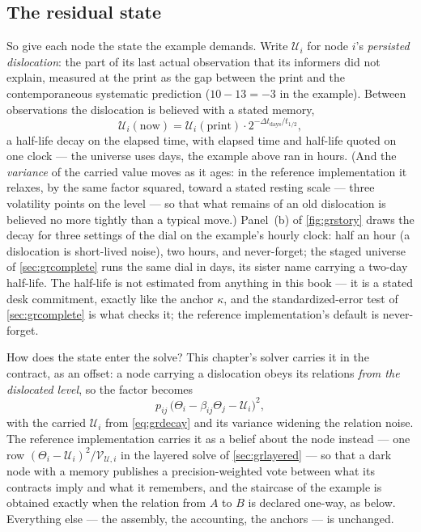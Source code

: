 \subsection{The residual state}

So give each node the state the example demands.  Write $\mathcal{U}_i$
for node $i$'s \emph{persisted dislocation}: the part of its last
actual observation that its informers did not explain, measured at the
print as the gap between the print and the contemporaneous
systematic prediction ($10-13=-3$ in the example).  Between
observations the dislocation is believed with a stated memory,
\begin{equation}
\mathcal{U}_i(\text{now})
=\mathcal{U}_i(\text{print})\cdot
2^{-\Delta t_{\mathrm{days}}/t_{1/2}},
\label{eq:grdecay}
\end{equation}
a half-life decay on the elapsed time, with elapsed time and
half-life quoted on one clock --- the universe uses
days, the example above ran in hours.  (And the \emph{variance} of the
carried value moves as it ages: in the reference implementation it
relaxes, by the same factor squared, toward a stated resting scale
--- three volatility points on the level --- so that what remains of
an old dislocation is believed no more tightly than a typical
move.)  Panel~(b) of \cref{fig:grstory} draws
the decay for three settings of the dial on the example's hourly clock:
half an hour (a dislocation is short-lived noise), two hours, and
never-forget; the staged universe of \cref{sec:grcomplete} runs the
same dial in days, its sister name carrying a two-day half-life.  The
half-life is not estimated from anything in this book --- it is a
stated desk commitment, exactly like the anchor $\kappa$, and the
standardized-error test of \cref{sec:grcomplete} is what checks it;
the reference implementation's default is never-forget.

How does the state enter the solve?  This chapter's solver carries
it in the contract, as an offset: a node carrying a dislocation obeys
its relations \emph{from the dislocated level}, so the factor becomes
\[
p_{ij}\,\bigl(\Theta_i-\beta_{ij}\Theta_j-\mathcal{U}_i\bigr)^{2},
\]
with the carried $\mathcal{U}_i$ from \cref{eq:grdecay} and its
variance widening the relation noise.  The reference implementation
carries it as a belief about the node instead --- one row
$(\Theta_i-\mathcal{U}_i)^{2}/\mathcal{V}_{\mathcal{U},i}$ in the
layered solve of \cref{sec:grlayered} --- so that a dark node with a
memory publishes a precision-weighted vote between what its
contracts imply and what it remembers, and the staircase of the
example is obtained exactly when the relation from $A$ to $B$ is
declared one-way, as below.  Everything else --- the
assembly, the accounting, the anchors --- is unchanged.

